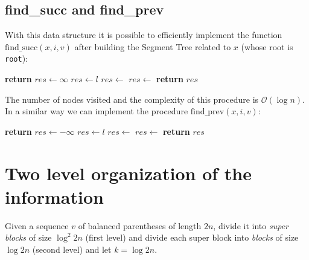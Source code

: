 \documentclass{article}
\begin{document}
\subsection{find\_succ and find\_prev}
With this data structure it is possible to efficiently implement the function $\text{find\_succ}(x,i,v)$ after building the Segment Tree related to $x$ (whose root is \texttt{root}):
    \begin{algorithmic}[1]
        \State \textbf{return} 
    \EndProcedure
    \State
            \State $res\gets\infty$
            \State $res\gets l$
        \Else
            \State $res\gets$
                \State $res\gets$
            \EndIf
        \EndIf
        \State \textbf{return} $res$
    \EndFunction
    \end{algorithmic}
The number of nodes visited and the complexity of this procedure is $\mathcal{O}(\log{n})$. In a similar way we can implement the procedure $\text{find\_prev}(x,i,v)$:
    \begin{algorithmic}[1]
        \State \textbf{return} 
    \EndProcedure
    \State
            \State $res\gets -\infty$
            \State $res\gets l$
        \Else
            \State $res\gets$
                \State $res\gets$
            \EndIf
        \EndIf
        \State \textbf{return} $res$
    \EndFunction
    \end{algorithmic}

\section{Two level organization of the information}
Given a sequence $v$ of balanced parentheses of length $2n$, divide it into \textit{super blocks} of size $\log^2{2n}$ (first level) and divide each super block into \textit{blocks} of size $\log{2n}$ (second level) and let $k=\log{2n}$.
\end{document}
